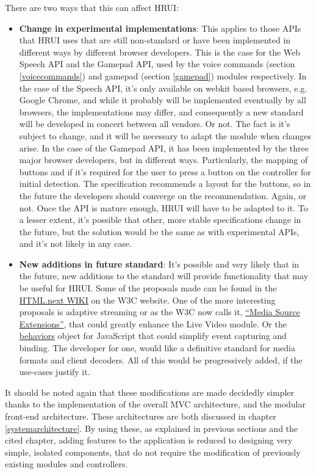 There are two ways that this can affect HRUI:
\begin{itemize}
	\item \textbf{Change in experimental implementations}: This applies to those APIs that HRUI uses that are still non-standard or 
	have been implemented in different ways by different browser developers. This is the case for the Web Speech API and the 
	Gamepad API, used by the voice commands (section \ref{voicecommands}) and gamepad (section \ref{gamepad}) modules respectively. 
	In the case of the Speech API, it's only available on webkit based browsers, e.g. Google Chrome, and while it probably will be 
	implemented eventually by all browsers, the implementations may differ, and consequently a new standard will be developed in 
	concert between all vendors. Or not. The fact is it's subject to change, and it will be necessary to adapt the module when 
	changes arise. In the case of the Gamepad API, it has been implemented by the three major browser developers, but in different 
	ways. Particularly, the mapping of buttons and if it's required for the user to press a button on the controller for initial 
	detection. The specification recommends a layout for the buttons, so in the future the developers should converge on the 
	recommendation. Again, or not. Once the API is mature enough, HRUI will have to be adapted to it. To a lesser extent, it's 
	possible that other, more stable specifications change in the future, but the solution would be the same as with experimental 
	APIs, and it's not likely in any case.
	\item \textbf{New additions in future standard}: It's possible and very likely that in the future, new additions to the 
	standard will provide functionality that may be useful for HRUI. Some of the proposals made can be found in the 
	\href{http://www.w3.org/wiki/HTML/next}{HTML.next WIKI} on the W3C website. One of the more interesting proposals is adaptive 
	streaming or as the W3C now calls it, \href{https://w3c.github.io/media-source/\#mediasource}{``Media Source Extensions''}, 
	that could greatly enhance the Live Video module. Or the \href{http://www.w3.org/wiki/HTML/next#.22behaviors.22}{behaviors} 
	object for JavaScript that could simplify event capturing and binding. The developer for one, would like a definitive standard 
	for media formats and client decoders. All of this would be progressively added, if the use-cases justify it.
\end{itemize}
It should be noted again that these modifications are made decidedly simpler thanks to the implementation of the overall MVC 
architecture, and the modular front-end architecture. These architectures are both discussed in chapter 
\ref{systemarchitecture}. By using these, as explained in previous sections and the cited chapter, adding features to the 
application is reduced to designing very simple, isolated components, that do not require the modification of previously 
existing modules and controllers.\\

